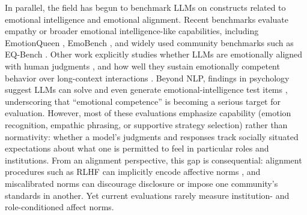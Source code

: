 \documentclass[11pt]{article}
\begin{document}
In parallel, the field has begun to benchmark LLMs on constructs related to emotional intelligence and emotional alignment.
Recent benchmarks evaluate empathy or broader emotional intelligence-like capabilities, including EmotionQueen \citep{chen-etal-2024-emotionqueen}, EmoBench \citep{sabour-etal-2024-emobench}, and widely used community benchmarks such as EQ-Bench \citep{paech2023eqbench}.
Other work explicitly studies whether LLMs are emotionally aligned with human judgments \citep{huang-etal-2024-apathetic}, and how well they sustain emotionally competent behavior over long-context interactions \citep{liu-etal-2025-longemotion}.
Beyond NLP, findings in psychology suggest LLMs can solve and even generate emotional-intelligence test items \citep{schlegel-etal-2025-ei-tests}, underscoring that ``emotional competence'' is becoming a serious target for evaluation.
However, most of these evaluations emphasize capability (emotion recognition, empathic phrasing, or supportive strategy selection) rather than normativity: whether a model's judgments and responses track socially situated expectations about what one is permitted to feel in particular roles and institutions.
From an alignment perspective, this gap is consequential: alignment procedures such as RLHF can implicitly encode affective norms \citep{ouyang-etal-2022-instructgpt,bai-etal-2022-constitutional-ai}, and miscalibrated norms can discourage disclosure or impose one community's standards in another.
Yet current evaluations rarely measure institution- and role-conditioned affect norms.
\end{document}
